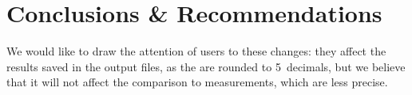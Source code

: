 \documentclass[a4paper, 11pt]{article}
\begin{document}
\section*{Conclusions \& Recommendations}
We would like to draw the attention of users to these changes: they affect the results saved in the output files, as the are rounded to 5~decimals, 
but we believe that it will not affect the comparison to measurements, which are less precise. 
\end{document}
